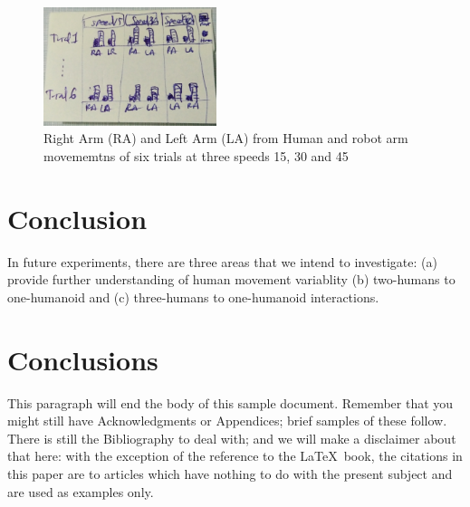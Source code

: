 \begin{figure}[!htb]
\centering
\includegraphics[width=0.45\textwidth]{figures/results/imus}
\caption[PA]{Right Arm (RA) and Left Arm (LA) from Human and robot arm movememtns
of six trials at three speeds 15, 30 and 45}
\label{fig:imus}
\end{figure}






\section{Conclusion}



In future experiments, there are three areas that we intend to investigate:
(a) provide further understanding of human movement variablity
(b) two-humans to one-humanoid and
(c) three-humans to one-humanoid interactions.









\section{Conclusions}
This paragraph will end the body of this sample document.
Remember that you might still have Acknowledgments or
Appendices; brief samples of these
follow.  There is still the Bibliography to deal with; and
we will make a disclaimer about that here: with the exception
of the reference to the \LaTeX\ book, the citations in
this paper are to articles which have nothing to
do with the present subject and are used as
examples only.





